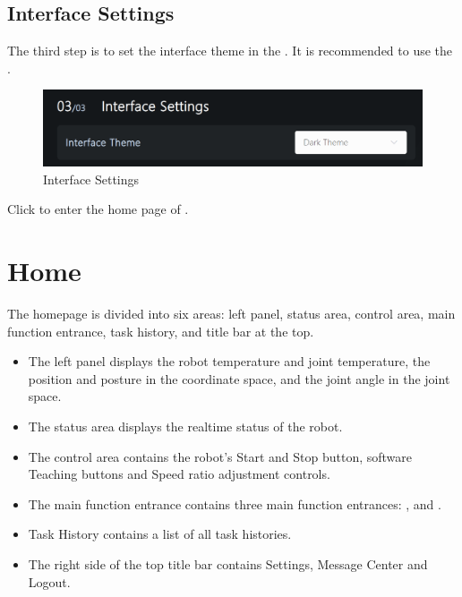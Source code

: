 \clearpage

\subsection{Interface Settings}

The third step is to set the interface theme in the . It is recommended to use the .

\begin{figure}[ht]
	\centering
	\includegraphics[width=\textwidth]{en/image/2-9.png}
	\caption{Interface Settings}
	\label{fig:界面设置}
\end{figure}

Click  to enter the home page of \LM.


\section{Home}

The \LM homepage is divided into six areas: left panel, status area, control area, main function entrance, task history, and title bar at the top.

\newpage

\begin{itemize}
\item The left panel displays the robot temperature and joint temperature, the position and posture in the coordinate space, and the joint angle in the joint space.
\item The status area displays the real­time status of the robot.
\item The control area contains the robot's Start and Stop button, software Teaching buttons and Speed ratio adjustment controls.
\item The main function entrance contains three main function en­trances: ,  and .
\item Task History contains a list of all task histories.
\item The right side of the top title bar contains Settings, Message Center and Logout.
\end{itemize}

